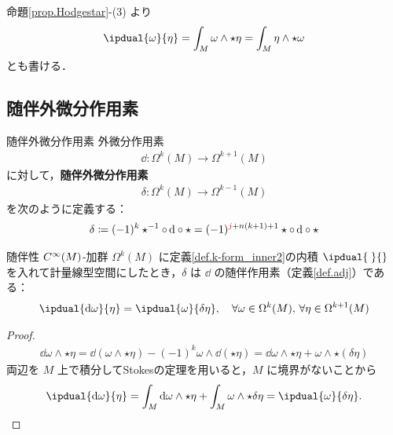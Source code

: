 \documentclass[geometry_main]{subfiles}
\begin{document}
命題\ref{prop.Hodgestar}-(3) より
\begin{align} 
	\ipdual{\omega}{\eta} = \int_M \omega \wedge \star \eta = \int_M \eta \wedge \star \omega
\end{align}
とも書ける．

\subsection{随伴外微分作用素}

\begin{mydef}[label=def.adj_extdiff]{随伴外微分作用素}
	外微分作用素
	\begin{align} 
		\dd{} \colon \Omega^k(M) \to \Omega^{k+1}(M)
	\end{align}
	に対して，\textbf{随伴外微分作用素}
	\begin{align} 
		\delta \colon \Omega^k(M) \to \Omega^{k-1}(M)
	\end{align}
	を次のように定義する：
	\begin{align} 
		\delta \coloneqq (-1)^k \star^{-1} \circ \dd{} \circ \star = (-1)^{\textcolor{red}{j} + n(k+1) + 1} \star \circ \dd{} \circ \star
	\end{align}
\end{mydef}

\begin{myprop}[label=prop.adj_extdiff]{随伴性}
	$C^\infty(M)$-加群 $\Omega^k(M)$ に定義\ref{def.k-form_inner2}の内積 $\ipdual{\;}{}$ を入れて計量線型空間にしたとき，$\delta$ は $\dd{}$ の随伴作用素（定義\ref{def.adj}）である：
	\begin{align} 
		\ipdual{\dd{\omega}}{\eta} = \ipdual{\omega}{\delta \eta},\quad \forall \omega \in \Omega^k(M),\, \forall \eta \in \Omega^{k+1}(M)
	\end{align}
\end{myprop}

\begin{proof} 
	\begin{align} 
		\dd{\omega} \wedge \star \eta = \dd{(\omega \wedge \star \eta)} - (-1)^{k} \omega \wedge \dd{(\star \eta)} = \dd{\omega \wedge \star \eta} + \omega \wedge \star (\delta\eta )
	\end{align}
	両辺を $M$ 上で積分してStokesの定理を用いると，$M$ に境界がないことから
	\begin{align} 
		\ipdual{\dd{\omega}}{\eta} = \int_M \dd{\omega \wedge \star \eta} + \int_M \omega \wedge \star \delta\eta = \ipdual{\omega}{\delta\eta}.
	\end{align}
\end{proof}
\end{document}
